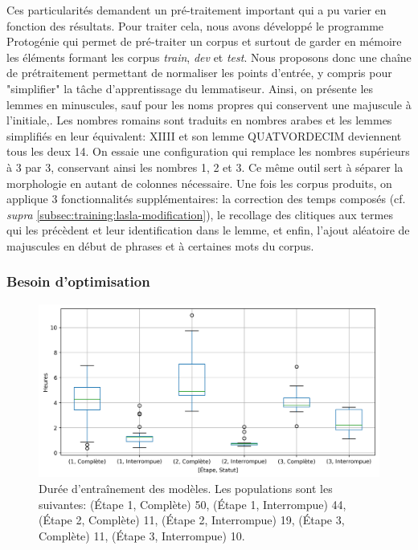 Ces particularités demandent un pré-traitement important qui a pu varier en fonction des résultats. Pour traiter cela, nous avons développé le programme Protogénie qui permet de pré-traiter un corpus et surtout de garder en mémoire les éléments formant les corpus \textit{train}, \textit{dev} et \textit{test}. Nous proposons donc une chaîne de prétraitement permettant de normaliser les points d'entrée, y compris pour "simplifier" la tâche d'apprentissage du lemmatiseur. Ainsi, on présente les lemmes en minuscules, sauf pour les noms propres qui conservent une majuscule à l'initiale,. Les nombres romains sont traduits en nombres arabes et les lemmes simplifiés en leur équivalent: XIIII et son lemme QUATVORDECIM deviennent tous les deux 14. On essaie une configuration qui remplace les nombres supérieurs à 3 par 3, conservant ainsi les nombres 1, 2 et 3. Ce même outil sert à séparer la morphologie en autant de colonnes nécessaire. Une fois les corpus produits, on applique 3 fonctionnalités supplémentaires: la correction des temps composés (cf. \textit{supra} \ref{subsec:training:lasla-modification}), le recollage des clitiques aux termes qui les précèdent et leur identification dans le lemme, et enfin, l'ajout aléatoire de majuscules en début de phrases et à certaines mots du corpus.

\subsubsection{Besoin d'optimisation}

\begin{figure}[ht]
    \centering
    \includegraphics[width=\textwidth]{results/lemmatisation/entrainement/TrainingDuration96BoxPlot.png}
    \caption{Durée d'entraînement des modèles. Les populations sont les suivantes: (Étape 1, Complète) 50, (Étape 1, Interrompue) 44, (Étape 2, Complète) 11, (Étape 2, Interrompue) 19, (Étape 3, Complète) 11, (Étape 3, Interrompue) 10.}
    \label{fig:lemmatisationTrainingTime}
\end{figure}

